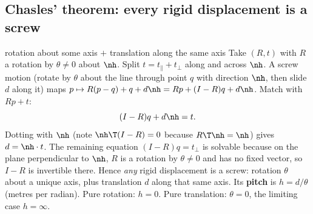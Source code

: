 \subsection{Chasles' theorem: every rigid displacement is a screw}\label{sec:rot:chasles-theorem-every}
\begin{deriv}{rotation about some axis $+$ translation along the same axis}
Take $(R,t)$ with $R$ a rotation by $\theta\neq0$ about $\nh$. Split $t=t_\parallel+t_\perp$ along and across $\nh$. A screw motion (rotate by $\theta$ about the line through point $q$ with direction $\nh$, then slide $d$ along it) maps $p\mapsto R(p-q)+q+d\nh=Rp+(I-R)q+d\nh$. Match with $Rp+t$:
\[
(I-R)q+d\nh=t .
\]
Dotting with $\nh$ (note $\nh\T(I-R)=0$ because $R\T\nh=\nh$) gives $d=\nh\cdot t$. The remaining equation $(I-R)q=t_\perp$ is solvable because on the plane perpendicular to $\nh$, $R$ is a rotation by $\theta\neq0$ and has no fixed vector, so $I-R$ is invertible there. Hence \emph{any} rigid displacement is a screw: rotation $\theta$ about a unique axis, plus translation $d$ along that same axis. Its \textbf{pitch} is $h=d/\theta$ (metres per radian). Pure rotation: $h=0$. Pure translation: $\theta=0$, the limiting case $h=\infty$.
\end{deriv}
